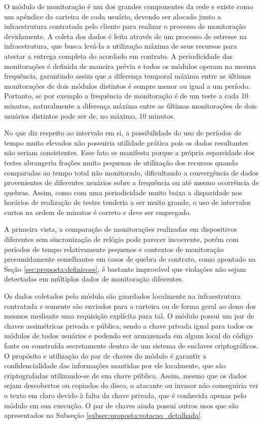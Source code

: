 O módulo de monitoração é um dos grandes componentes da rede e existe como um apêndice da carteira de cada usuário, devendo ser alocado junto a infraestrutura contratada pelo cliente para realizar o processo de monitoração devidamente. A coleta dos dados é feita através de um processo de estresse na infraestrutura, que busca levá-la a utilização máxima de seus recursos para atestar a entrega completa do acordado em contrato. A periodicidade das monitorações é definida de maneira prévia e todos os módulos operam na mesma frequência, garantindo assim que a diferença temporal máxima entre as últimas monitorações de dois módulos distintos é sempre menor ou igual a um período. Portanto, se por exemplo a frequência de monitoração é de um teste a cada 10 minutos, naturalmente a diferença máxima entre as últimas monitorações de dois usuários distintos pode ser de, no máximo, 10 minutos.

%
No que diz respeito ao intervalo em si, a possibilidade do uso de períodos de tempo muito elevados não possuiria utilidade prática pois os dados resultantes não seriam consistentes. Esse fato se manifesta porque a própria esparsidade dos testes abrangeria frações muito pequenas de utilização dos recursos quando comparadas ao tempo total não monitorado, dificultando a convergência de dados provenientes de diferentes usuários sobre a frequência ou até mesmo ocorrência de quebras. Assim, como com uma periodicidade muito baixa a disparidade nos horários de realização de testes tenderia a ser muito grande, o uso de intervalos curtos na ordem de minutos é correto e deve ser empregado. 

%
A primeira vista, a comparação de monitorações realizadas em dispositivos diferentes sem sincronização de relógio pode parecer incoerente, porém com períodos de tempo relativamente pequenos e contextos de monitoração presumidamente semelhantes em casos de quebra de contrato, como apontado na Seção \ref{sec:proposta:definicoes}, é bastante improvável que violações não sejam detectadas em múltiplos dados de monitoração diferentes.

%
Os dados coletados pelo módulo são guardados localmente na infraestrutura contratada e somente são enviados para a carteira ou de forma geral ao dono dos mesmos mediante uma requisição explícita para tal. O módulo possui um par de chaves assimétricas privada e pública, sendo a chave privada igual para todos os módulos de todos usuários e podendo ser armazenada em algum local do código fonte ou construída secretamente dentro de um sistema de enclaves criptográficos. O propósito e utilização do par de chaves do módulo é garantir a confidencialidade das informações mantidas por ele localmente, que são criptografadas utilizando-se de sua chave pública. Assim, mesmo que os dados sejam descobertos ou copiados do disco, o atacante ou invasor não conseguiria ver o texto em claro devido à falta da chave privada, que é conhecida apenas pelo módulo em sua execução. O par de chaves ainda possui outros usos que são apresentados na Subseção \ref{subsec:proposta:votacao_detalhada}.

